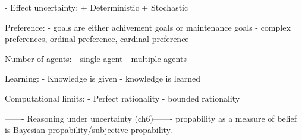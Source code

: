 - Effect uncertainty:
+ Deterministic
+ Stochastic

Preference:
- goals are either achivement goals or maintenance goals
- complex preferences, ordinal preference, cardinal preference

Number of agents:
- single agent
- multiple agents

Learning:
- Knowledge is given
- knowledge is learned

Computational limits:
- Perfect rationality
- bounded rationality

------- Reasoning under uncertainty (ch6)-------
propability as a measure of belief is Bayesian propability/subjective
propability.





% 






